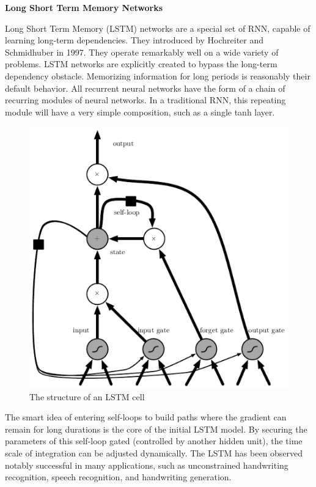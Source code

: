 {\large \textbf{Long Short Term Memory Networks}}

Long Short Term Memory (LSTM) networks are a special set of RNN, capable of learning long-term dependencies.
They introduced by Hochreiter and Schmidhuber in 1997.
They operate remarkably well on a wide variety of problems.
LSTM networks are explicitly created to bypass the long-term dependency obstacle.
Memorizing information for long periods is reasonably their default behavior.
All recurrent neural networks have the form of a chain of recurring modules of neural networks.
In a traditional RNN, this repeating module will have a very simple composition, such as a single tanh layer.

\begin{figure}[H]
    \centering
    \includegraphics[scale=0.8]{./images/background/lstm.png}
    \caption{The structure of an LSTM cell}
    \label{fig:lstm}
\end{figure}

The smart idea of entering self-loops to build paths where the gradient can remain for long durations is the core of the initial LSTM model.
By securing the parameters of this self-loop gated (controlled by another hidden unit), the time scale of integration can be adjusted dynamically.
The LSTM has been observed notably successful in many applications, such as unconstrained handwriting recognition, speech recognition, and
handwriting generation.

